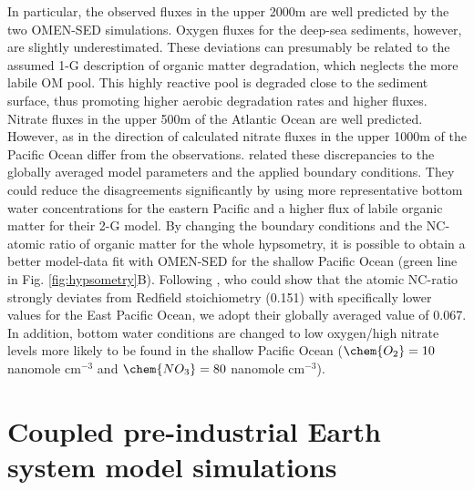 \documentclass[gmd, manuscript]{copernicus}
\begin{document}
In particular, the observed  fluxes in the upper 2000m are well predicted by the two OMEN-SED simulations. Oxygen fluxes for the deep-sea sediments, however, are slightly underestimated. 
These deviations can presumably be related to the assumed 1-G description of organic matter degradation, which neglects the more labile OM pool. This highly reactive pool is degraded close to the sediment surface, 
thus promoting higher aerobic degradation rates and higher  fluxes.  
Nitrate fluxes in the upper 500m of the Atlantic Ocean are well predicted. However, as in \citet{middelburg_denitrification_1996} the direction of calculated nitrate fluxes in the upper 1000m of the Pacific Ocean differ from the observations. 
\citet{middelburg_denitrification_1996} related these discrepancies to the globally averaged model parameters and the applied boundary conditions. They could reduce the disagreements significantly by using more representative 
bottom water concentrations for the eastern Pacific and a higher flux of labile organic matter for their 2-G model. By changing the boundary conditions and the NC-atomic ratio of organic matter for the whole hypsometry, it is possible 
to obtain a better model-data fit with OMEN-SED for the shallow Pacific Ocean (green line in Fig. \ref{fig:hypsometry}B). 
Following \citet{bohlen_simple_2012}, who could show that the atomic NC-ratio strongly deviates from Redfield stoichiometry (0.151) with specifically lower values for the East Pacific Ocean, we adopt their globally averaged value of 0.067. 
In addition, bottom water conditions are changed to low oxygen/high nitrate levels more likely to be found in the shallow Pacific Ocean ($\chem{O_2} = 10$ nanomole cm$^{-3}$ and $\chem{NO_3} = 80$ nanomole cm$^{-3}$). 


\section{Coupled pre-industrial Earth system model simulations}\label{sec:ESM_coupling}
\end{document}

